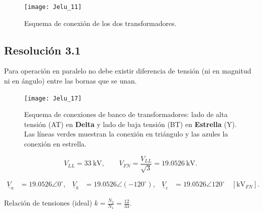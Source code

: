 \documentclass[
  11pt,
  letterpaper,
   addpoints,
  ]{exam}
\begin{document}
\begin{questions}

\begin{figure}[h!]
  \centering
    \texttt{[image: Jelu\_11]}
  \caption{Esquema de conexión de los dos transformadores.}
  \label{fig:trafos-paralelo}
\end{figure}
\begin{solution}

\subsection*{Resolución 3.1}
Para operación en paralelo no debe existir diferencia de tensión (ni en magnitud ni en ángulo) entre las bornas que se unan.
\begin{figure}[H]
  \centering
\texttt{[image: Jelu\_17]}
  \caption{Esquema de conexiones de banco de transformadores: lado de alta tensión (AT) en \textbf{Delta} y lado de baja tensión (BT) en \textbf{Estrella} (Y). Las líneas verdes muestran la conexión en triángulo y las azules la conexión en estrella.}
\end{figure}
\begin{equation}
V_{LL}=33~\text{kV},\qquad 
V_{FN}=\frac{V_{LL}}{\sqrt{3}}=19.0526~\text{kV}.
\end{equation}

\begin{align}
\underline{V}_a&=19.0526\angle 0^\circ,
&
\underline{V}_b&=19.0526\angle (-120^\circ),
&
\underline{V}_c&=19.0526\angle 120^\circ
\quad [\text{kV}_{FN}].
\end{align}

Relación de tensiones (ideal) \(k=\tfrac{N_2}{N_1}=\tfrac{12}{33}\).


\end{solution}
\end{questions}
\end{document}
